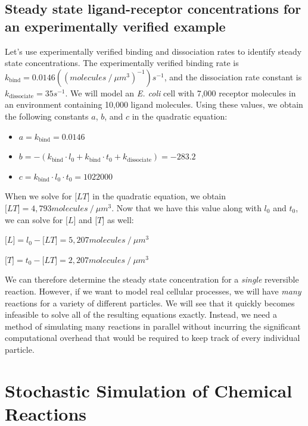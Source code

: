 \subsection{Steady state ligand-receptor concentrations for an experimentally verified example}

Let's use experimentally verified binding and dissociation rates to identify steady state concentrations. The experimentally verified binding rate is $k_\text{bind} = 0.0146 ((molecules\mathbin{/}\mu m^3)^{-1})s^{-1}$, and the dissociation rate constant is $k_\text{dissociate} = 35s^{-1}$. We will model an \textit{E. coli} cell with 7,000 receptor molecules in an environment containing 10,000 ligand molecules. Using these values, we obtain the following constants $a$, $b$, and $c$ in the quadratic equation:

\begin{itemize}
 \item $a = k_\text{bind} = 0.0146$
 \item $b = - (k_\text{bind} \cdot l_0 + k_\text{bind} \cdot t_0 + k_\text{dissociate}) = -283.2$
 \item $c = k_\text{bind} \cdot l_0 \cdot t_0 = 1022000$
\end{itemize}

When we solve for $\text{[}LT\text{]}$ in the quadratic equation, we obtain $\text{[}LT\text{]} = 4,793 molecules\mathbin{/}\mu m^3$. Now that we have this value along with $l_0$ and $t_0$, we can solve for $\text{[}L\text{]}$ and $\text{[}T\text{]}$ as well:

$\text{[}L\text{]} = l_0 - \text{[}LT\text{]} = 5,207 molecules\mathbin{/}\mu m^3$

$\text{[}T\text{]} = t_0 - \text{[}LT\text{]} = 2,207 molecules\mathbin{/}\mu m^3$

We can therefore determine the steady state concentration for a \textit{single} reversible reaction. However, if we want to model real cellular processes, we will have \textit{many} reactions for a variety of different particles. We will see that it quickly becomes infeasible to solve all of the resulting equations exactly. Instead, we need a method of simulating many reactions in parallel without incurring the significant computational overhead that would be required to keep track of every individual particle.

\FloatBarrier
{}

\section{Stochastic Simulation of Chemical Reactions}
\label{sec:stochastic_simulation_of_chemical_reactions}
